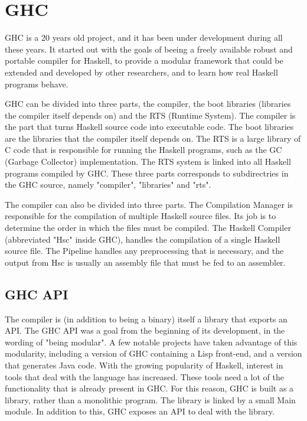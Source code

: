 


\section{GHC}

GHC is a 20 years old project, and it has been under development during
all these years. It started out with the goals of beeing a freely available
robust and portable compiler for Haskell, to provide a modular framework that
could be extended and developed by other researchers, and to learn how real
Haskell programs behave. \cite{marlow2012glasgow}

GHC can be divided into three parts, the compiler, the boot libraries
(libraries the compiler itself depends on) and the RTS (Runtime System). 
The compiler is the part
that turns Haskell source code into executable code. The boot libraries are the 
libraries that the compiler itself depends on. The RTS is a large library
of C code that is responsible for running the Haskell programs, such as the 
GC (Garbage Collector) implementation. The RTS system is linked into all 
Haskell programs compiled by GHC. These three parts corresponds to subdirectries
in the GHC source, namely "compiler", "libraries" and "rts".
\cite{marlow2012glasgow}

The compiler can also be divided into three parts. The Compilation Manager is 
responsible for the compilation of multiple Haskell source files. Its job is to
determine the order in which the files must be compiled. The Haskell Compiler 
(abbreviated "Hsc" inside GHC), handles the compilation of a single Haskell source
file. The Pipeline handles any preprocessing that is necessary, and the output
from Hsc is usually an assembly file that must be fed to an assembler.
\cite{marlow2012glasgow}


\subsection{GHC API}

The compiler is (in addition to being a binary) itself a library that exports an API.
The GHC API was a goal from the beginning of its development, in the wording of
"being modular". A few notable projects have taken advantage of this modularity,
including a version of GHC containing a Lisp front-end, and a version that generates
Java code. With the growing popularity of Haskell, interest in tools that deal with
the language has increased. These tools need a lot of the functionality that is already
present in GHC. For this reason, GHC is built as a library, rather than a monolithic
program. The library is linked by a small Main module. In addition to this, GHC
exposes an API to deal with the library.\cite{marlow2012glasgow} 

